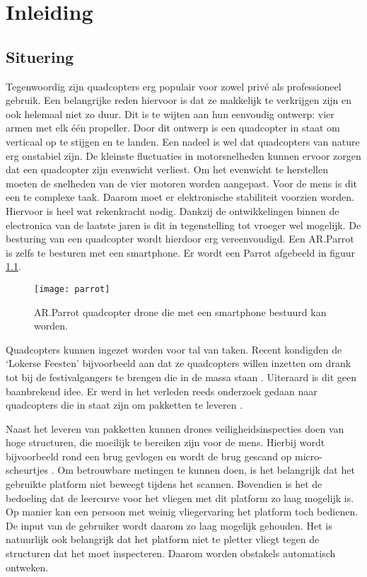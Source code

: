 \chapter{Inleiding}

\section{Situering}\label{sec:situering}

Tegenwoordig zijn quadcopters erg populair voor zowel priv\'e als professioneel gebruik. Een belangrijke reden hiervoor is dat ze makkelijk te verkrijgen zijn en ook helemaal niet zo duur. Dit is te wijten aan hun eenvoudig ontwerp: vier armen met elk \'e\'en propeller. Door dit ontwerp is een quadcopter in staat om verticaal op te stijgen en te landen. Een nadeel is wel dat quadcopters van nature erg onstabiel zijn. De kleinste fluctuaties in motorsnelheden kunnen ervoor zorgen dat een quadcopter zijn evenwicht verliest. Om het evenwicht te herstellen moeten de snelheden van de vier motoren worden aangepast. Voor de mens is dit een te complexe taak. Daarom moet er elektronische stabiliteit voorzien worden. Hiervoor is heel wat rekenkracht nodig. Dankzij de ontwikkelingen binnen de electronica van de laatste jaren is dit in tegenstelling tot vroeger wel mogelijk. De besturing van een quadcopter wordt hierdoor erg vereenvoudigd. Een AR.Parrot is zelfs te besturen met een smartphone. Er wordt een Parrot afgebeeld in figuur \ref{fig:parrot}.

\begin{figure}[h]
	\centering
	\texttt{[image: parrot]}
	\caption{AR.Parrot quadcopter drone die met een smartphone bestuurd kan worden.}
	\label{fig:parrot}
\end{figure}

\npar Quadcopters kunnen ingezet worden voor tal van taken. Recent kondigden de `Lokerse Feesten' bijvoorbeeld aan dat ze quadcopters willen inzetten om drank tot bij de festivalgangers te brengen die in de massa staan \cite{url:lokerse}. Uiteraard is dit geen baanbrekend idee. Er werd in het verleden reeds onderzoek gedaan naar quadcopters die in staat zijn om pakketten te leveren \cite{paper:deliveryQuad}.

\npar Naast het leveren van pakketten kunnen drones veiligheidsinspecties doen van hoge structuren, die moeilijk te bereiken zijn voor de mens. Hierbij wordt bijvoorbeeld rond een brug gevlogen en wordt de brug gescand op micro-scheurtjes \cite{paper:structureInspection1}\cite{paper:structureInspection2}. Om betrouwbare metingen te kunnen doen, is het belangrijk dat het gebruikte platform niet beweegt tijdens het scannen. Bovendien is het de bedoeling dat de leercurve voor het vliegen met dit platform zo laag mogelijk is. Op manier kan een persoon met weinig vliegervaring het platform toch bedienen. De input van de gebruiker wordt daarom zo laag mogelijk gehouden. Het is natuurlijk ook belangrijk dat het platform niet te pletter vliegt tegen de structuren dat het moet inspecteren. Daarom worden obstakels automatisch ontweken.

